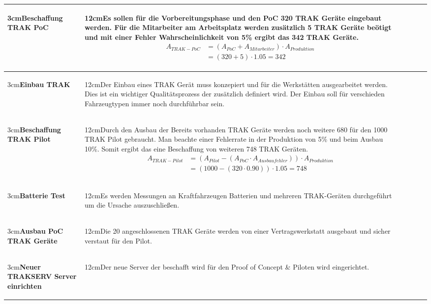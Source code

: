 \documentclass[a4paper,10pt]{scrartcl}
\newcommand\Umbruch[2][3cm]{\begin{varwidth}{#1}\centering#2\end{varwidth}}
\newcommand\Absatz[2][12cm]{\begin{varwidth}{#1}\flushleft#2\end{varwidth}}
\begin{document}
\begin{adjustbox}{width=\textwidth}
\begin{tabular}{llrrrr}
\midrule
{\Umbruch{\textbf{Beschaffung TRAK PoC}}}  & {\Absatz{Es sollen für die Vorbereitungsphase und den PoC 320 TRAK Geräte eingebaut werden. Für die Mitarbeiter am Arbeitsplatz werden zusätzlich 5 TRAK Geräte beötigt und mit einer Fehler Wahrscheinlichkeit von 5\% ergibt das 342 TRAK Geräte.
\begin{equation}
\begin{split}
A_{TRAK-PoC} &= (A_{PoC} + A_{Mitarbeiter}) \cdot A_{Produktion} \\\
&=(320 + 5) \cdot 1.05 = 342
\end{split}
\end{equation}
\linebreak}} \\
\midrule
{\Umbruch{\textbf{Einbau TRAK}}}  & {\Absatz{Der Einbau eines TRAK Gerät muss konzepiert und für die
Werkstätten ausgearbeitet werden. Dies ist ein wichtiger Qualitätsprozess der zusätzlich definiert wird. Der Einbau soll für verschieden Fahrzeugtypen immer noch durchführbar sein.\linebreak}} \\
\midrule
{\Umbruch{\textbf{Beschaffung TRAK Pilot}}}  & {\Absatz{Durch den Ausbau der Bereits vorhanden
TRAK Geräte werden noch weitere 680 für den 1000 TRAK Pilot gebraucht. Man beachte einer Fehlerrate in der Produktion von 5\% und beim Ausbau 10\%. Somit ergibt das eine Beschaffung von weiteren 748 TRAK Geräten.
\begin{equation}
\begin{split}
A_{TRAK-Pilot} &= (A_{Pilot} - (A_{PoC} \cdot A_{Ausbaufehler})) \cdot A_{Produktion} \\\
&= (1000 - (320 \cdot 0.90)) \cdot 1.05 = 748
\end{split}
\end{equation}
\linebreak}} \\
\midrule
{\Umbruch{\textbf{Batterie Test}}}  & {\Absatz{Es werden Messungen an Kraftfahrzeugen Batterien und mehreren TRAK-Geräten durchgeführt um die Ursache auszuschließen.
\linebreak}} \\
\midrule
{\Umbruch{\textbf{Ausbau PoC TRAK Geräte}}}  & {\Absatz{Die 20 angeschlossenen TRAK Geräte werden von einer Vertragswerkstatt ausgebaut und sicher verstaut für den Pilot.
\linebreak}} \\
\midrule
{\Umbruch{\textbf{Neuer TRAKSERV Server einrichten}}}  & {\Absatz{Der neue Server der beschafft wird für den Proof of Concept \& Piloten wird eingerichtet.
}}
\end{tabular}
\end{adjustbox}
\end{document}
